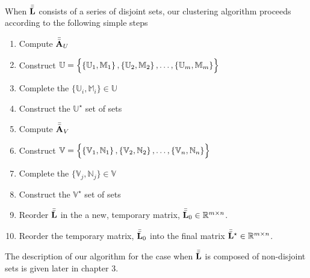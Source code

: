 \documentclass[../ClusteringConnectionsMAIN.tex]{subfiles}
\begin{document}
\begin{flushleft}
\begin{large}

When $\bar{\bar{\mathbf{L}}}$ consists of a series of disjoint sets, our clustering algorithm proceeds according to the following simple steps

\begin{enumerate}
\item Compute $\bar{\bar{\mathbf{A}}}_U$
\item Construct $\mathbb{U} = \Bigl\{ \left\{ \mathbb{U}_1, \mathbb{M}_1 \right\}, \left\{ \mathbb{U}_2, \mathbb{M}_2 \right\}, \dots, \left\{ \mathbb{U}_m, \mathbb{M}_m \right\} \Bigr\}$
\item Complete the $\bigl\{ \mathbb{U}_i, \mathbb{M}_i \bigr\} \in \mathbb{U}$
\item Construct the $\mathbb{U}^\star$ set of sets
\item Compute $\bar{\bar{\mathbf{A}}}_V$
\item Construct $\mathbb{V} = \Bigl\{ \left\{ \mathbb{V}_1, \mathbb{N}_1 \right\}, \left\{ \mathbb{V}_2, \mathbb{N}_2 \right\}, \dots, \left\{ \mathbb{V}_n, \mathbb{N}_n \right\} \Bigr\}$
\item Complete the $\bigl\{ \mathbb{V}_j, \mathbb{N}_j \bigr\} \in \mathbb{V}$
\item Construct the $\mathbb{V}^\star$ set of sets
\item Reorder $\bar{\bar{\mathbf{L}}}$ in the a new, temporary matrix, $\bar{\bar{\mathbf{L}}}_0 \in \mathbb{R}^{m \times n}$.
\item Reorder the temporary matrix, $\bar{\bar{\mathbf{L}}}_0$ into the final matrix $\bar{\bar{\mathbf{L}}}^\star \in \mathbb{R}^{m \times n}$.
\end{enumerate}

The description of our algorithm for the case when $\bar{\bar{\mathbf{L}}}$ is composed of non-disjoint sets is given later in chapter 3.


\end{large}
\end{flushleft}
\end{document}
